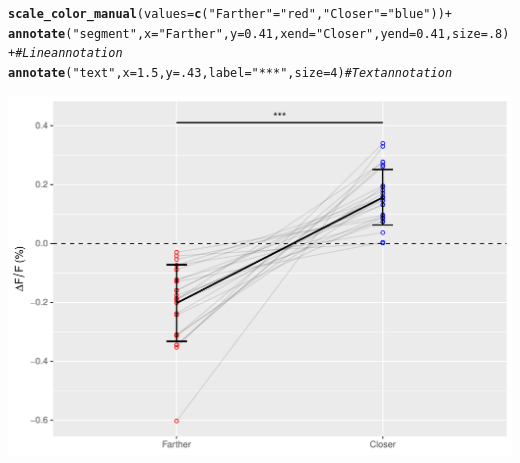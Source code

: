 \documentclass{article}\usepackage[]{graphicx}\usepackage[]{xcolor}
\makeatletter
\def\maxwidth{ %
  \ifdim\Gin@nat@width>\linewidth
    \linewidth
  \else
    \Gin@nat@width
  \fi
}
\newcommand{\hlnum}[1]{\textcolor[rgb]{0.686,0.059,0.569}{#1}}%
\newcommand{\hlsng}[1]{\textcolor[rgb]{0.192,0.494,0.8}{#1}}%
\newcommand{\hlcom}[1]{\textcolor[rgb]{0.678,0.584,0.686}{\textit{#1}}}%
\newcommand{\hlopt}[1]{\textcolor[rgb]{0,0,0}{#1}}%
\newcommand{\hldef}[1]{\textcolor[rgb]{0.345,0.345,0.345}{#1}}%
\newcommand{\hlkwc}[1]{\textcolor[rgb]{0.333,0.667,0.333}{#1}}%
\newcommand{\hlkwd}[1]{\textcolor[rgb]{0.737,0.353,0.396}{\textbf{#1}}}%
\newenvironment{kframe}{%
 \def\at@end@of@kframe{}%
 \ifinner\ifhmode%
  \def\at@end@of@kframe{\end{minipage}}%
  \begin{minipage}{\columnwidth}%
 \fi\fi%
 \def\FrameCommand##1{\hskip\@totalleftmargin \hskip-\fboxsep
 \colorbox{shadecolor}{##1}\hskip-\fboxsep
     \hskip-\linewidth \hskip-\@totalleftmargin \hskip\columnwidth}%
 \MakeFramed {\advance\hsize-\width
   \@totalleftmargin\z@ \linewidth\hsize
   \@setminipage}}%
 {\par\unskip\endMakeFramed%
 \at@end@of@kframe}
\newenvironment{knitrout}{}{} %
\makeatother
\begin{document}
\begin{enumerate}
\begin{enumerate}
\begin{knitrout}
\begin{kframe}
\begin{alltt}
  \hlkwd{scale_color_manual}\hldef{(}\hlkwc{values} \hldef{=} \hlkwd{c}\hldef{(}\hlsng{"Farther"} \hldef{=} \hlsng{"red"}\hldef{,} \hlsng{"Closer"} \hldef{=} \hlsng{"blue"}\hldef{))} \hlopt{+}
  \hlkwd{annotate}\hldef{(}\hlsng{"segment"}\hldef{,} \hlkwc{x} \hldef{=} \hlsng{"Farther"}\hldef{,} \hlkwc{y} \hldef{=} \hlnum{0.41}\hldef{,} \hlkwc{xend} \hldef{=} \hlsng{"Closer"}\hldef{,} \hlkwc{yend} \hldef{=} \hlnum{0.41}\hldef{,} \hlkwc{size} \hldef{=} \hlnum{.8}\hldef{)} \hlopt{+} \hlcom{# Line annotation}
  \hlkwd{annotate}\hldef{(}\hlsng{"text"}\hldef{,} \hlkwc{x} \hldef{=} \hlnum{1.5}\hldef{,} \hlkwc{y} \hldef{=} \hlnum{.43}\hldef{,} \hlkwc{label} \hldef{=} \hlsng{"***"}\hldef{,} \hlkwc{size} \hldef{=} \hlnum{4}\hldef{)} \hlcom{# Text annotation }
\end{alltt}
\end{kframe}
\includegraphics[width=\maxwidth]{figure/unnamed-chunk-5-1} 
\end{knitrout}


\end{enumerate}
\end{enumerate}
\end{document}
